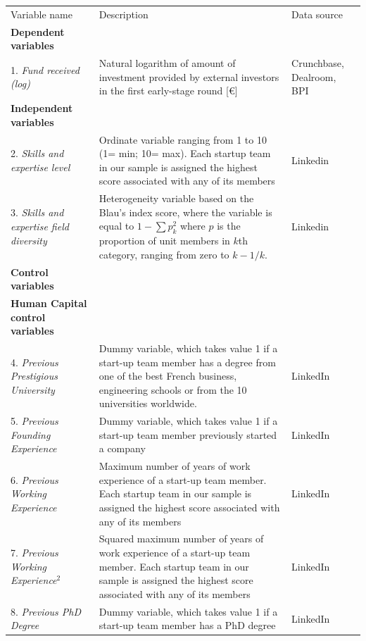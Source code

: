 \documentclass[12pt]{article}
\begin{document}
\begin{table} [ht]
\scriptsize
\renewcommand{\arraystretch}{1.5}
\begin{tabularx}{\textwidth}{ p{5cm} p{7cm} p{2.2cm} }
\toprule
\multicolumn{1}{l}{Variable name}&\multicolumn{1}{l}{Description}&\multicolumn{1}{l}{Data source}\\
\cmidrule(r){1-3}
\textbf{Dependent variables}& &\\
1. \textit{Fund received (log)} & Natural logarithm of amount of investment provided by external investors in the first early-stage round [€] & Crunchbase, Dealroom, BPI\\
\cmidrule(r){2-3}
\textbf{Independent variables}& &\\
2. \textit{Skills and expertise level} & Ordinate variable ranging from 1 to 10 (1= min; 10= max). Each startup team in our sample is assigned the highest score associated with any of its members & Linkedin\\
3. \textit{Skills and expertise field diversity} & Heterogeneity variable based on the Blau's index score, where the variable is equal to $1-\sum p_k^2$ where $p$ is the proportion of unit members in $k$th category, ranging from zero to $k-1/k$. & Linkedin\\
\cmidrule(r){2-3}
\textbf{Control variables}& &\\
\textbf{Human Capital control variables}& &\\
4. \textit{Previous Prestigious University} & Dummy variable, which takes value 1 if a start-up team member has a degree from one of the best French business, engineering schools or from the 10 universities worldwide. & LinkedIn\\
5. \textit{Previous Founding Experience} & Dummy variable, which takes value 1 if a start-up team member previously started a company & LinkedIn\\
6. \textit{Previous Working Experience} & Maximum number of years of work experience of a start-up team member. Each startup team in our sample is assigned the highest score associated with any of its members & LinkedIn\\
7. \textit{Previous Working Experience$^2$} & Squared maximum number of years of work experience of a start-up team member. Each startup team in our sample is assigned the highest score associated with any of its members & LinkedIn\\
8. \textit{Previous PhD Degree} & Dummy variable, which takes value 1 if a start-up team member has a PhD degree & LinkedIn\\

\end{tabularx}
\end{table}
\end{document}
